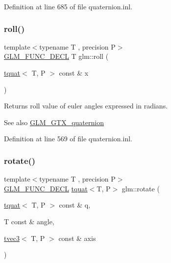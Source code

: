 Definition at line 685 of file quaternion.\+inl.

\mbox{\label{group__gtc__quaternion_ga4fd705376c6c1fd667be0055a0ea58ec}} 
\subsubsection{\texorpdfstring{roll()}{roll()}}
{\footnotesize\ttfamily template$<$typename T , precision P$>$ \\
\mbox{\hyperlink{setup_8hpp_ab2d052de21a70539923e9bcbf6e83a51}{G\+L\+M\+\_\+\+F\+U\+N\+C\+\_\+\+D\+E\+CL}} T glm\+::roll (\begin{DoxyParamCaption}\item[{\mbox{\hyperlink{structglm_1_1tquat}{tquat}}$<$ T, P $>$ const \&}]{x }\end{DoxyParamCaption})}

Returns roll value of euler angles expressed in radians.

\begin{DoxySeeAlso}{See also}
\mbox{\hyperlink{group__gtx__quaternion}{G\+L\+M\+\_\+\+G\+T\+X\+\_\+quaternion}} 
\end{DoxySeeAlso}


Definition at line 569 of file quaternion.\+inl.

\mbox{\label{group__gtc__quaternion_gaa8f42979c921e450ff2812fb43c25702}} 
\subsubsection{\texorpdfstring{rotate()}{rotate()}}
{\footnotesize\ttfamily template$<$typename T , precision P$>$ \\
\mbox{\hyperlink{setup_8hpp_ab2d052de21a70539923e9bcbf6e83a51}{G\+L\+M\+\_\+\+F\+U\+N\+C\+\_\+\+D\+E\+CL}} \mbox{\hyperlink{structglm_1_1tquat}{tquat}}$<$T, P$>$ glm\+::rotate (\begin{DoxyParamCaption}\item[{\mbox{\hyperlink{structglm_1_1tquat}{tquat}}$<$ T, P $>$ const \&}]{q,  }\item[{T const \&}]{angle,  }\item[{\mbox{\hyperlink{structglm_1_1tvec3}{tvec3}}$<$ T, P $>$ const \&}]{axis }\end{DoxyParamCaption})}

